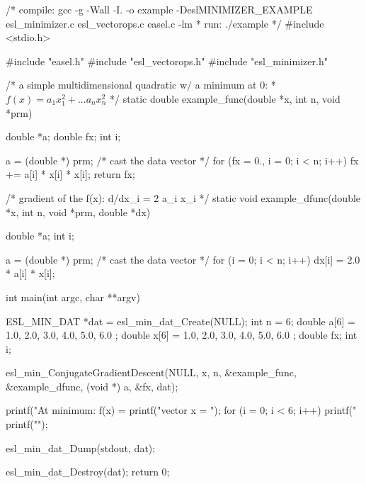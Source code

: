 \begin{cchunk}
/* compile: gcc -g -Wall -I. -o example -DeslMINIMIZER_EXAMPLE esl_minimizer.c esl_vectorops.c easel.c -lm
 * run:     ./example 
 */
#include <stdio.h>

#include "easel.h"
#include "esl_vectorops.h"
#include "esl_minimizer.h"

/* a simple multidimensional quadratic w/ a minimum at 0:
 *    $f(x) = a_1 x_1^2 + ... a_n x_n^2$
 */ 
static double
example_func(double *x, int n, void *prm)
{
  double *a;
  double  fx;
  int     i;

  a = (double *) prm;	/* cast the data vector */
  for (fx = 0., i = 0; i < n; i++)
    fx += a[i] * x[i] * x[i];
  return fx;
}
/* gradient of the f(x): d/dx_i = 2 a_i x_i
 */
static void
example_dfunc(double *x, int n, void *prm, double *dx)
{
  double *a;
  int     i;

  a = (double *) prm;	/* cast the data vector */
  for (i = 0; i < n; i++)
    dx[i] = 2.0 * a[i] * x[i];
}
int
main(int argc, char **argv)
{
  ESL_MIN_DAT *dat = esl_min_dat_Create(NULL);
  int    n = 6;
  double a[6] = { 1.0, 2.0, 3.0, 4.0, 5.0, 6.0 };
  double x[6] = { 1.0, 2.0, 3.0, 4.0, 5.0, 6.0 };
  double fx;
  int    i;

  esl_min_ConjugateGradientDescent(NULL, x, n, 
				   &example_func, &example_dfunc, (void *) a, 
				   &fx, dat);

  printf("At minimum: f(x) = %
  printf("vector x = ");
  for (i = 0; i < 6; i++) printf("%
  printf("\n");

  esl_min_dat_Dump(stdout, dat);

  esl_min_dat_Destroy(dat);
  return 0;
}
\end{cchunk}

